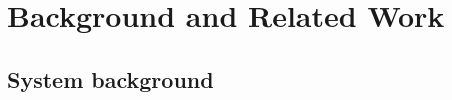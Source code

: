\section{Background and Related Work}
\label{sectionbackground}


\subsection{System background}

{\sysname}~\cite{Levin2015Performance}


